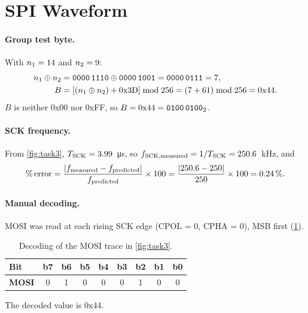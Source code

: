 \section{SPI Waveform}
\label{sec:spi-waveform}

\paragraph{Group test byte.}
With $n_1 = 14$ and $n_2 = 9$:
\begin{align}
  n_1 \oplus n_2 &= \texttt{0000\,1110} \oplus \texttt{0000\,1001} = \texttt{0000\,0111} = 7, \\
  B &= \left[(n_1 \oplus n_2) + \text{0x3D}\right] \bmod 256
     = (7 + 61) \bmod 256 = \text{0x44}.
\end{align}
$B$ is neither 0x00 nor 0xFF, so $B = \text{0x44} = \texttt{0100\,0100}_2$.


\paragraph{SCK frequency.}
From \cref{fig:task3}, $T_\mathrm{SCK} = 3.99$~\si{\micro\second}, so
$f_\mathrm{SCK,measured} = 1/T_\mathrm{SCK} = 250.6$~kHz, and
\begin{equation}
  \%\,\mathrm{error}
  = \frac{\lvert f_\mathrm{measured} - f_\mathrm{predicted}\rvert}{f_\mathrm{predicted}} \times 100
  = \frac{\lvert 250.6 - 250 \rvert}{250} \times 100
  = 0.24\,\%.
\end{equation}

\paragraph{Manual decoding.}
MOSI was read at each rising SCK edge (CPOL = 0, CPHA = 0), MSB first
(\cref{tab:decode}).

\begin{table}[htbp]
  \centering
  \caption{Decoding of the MOSI trace in \cref{fig:task3}.}
  \label{tab:decode}
  \begin{tabular}{@{}lcccccccc@{}}
    \toprule
    \textbf{Bit}  & b7 & b6 & b5 & b4 & b3 & b2 & b1 & b0 \\
    \midrule
    \textbf{MOSI} & 0 & 1 & 0 & 0 & 0 & 1 & 0 & 0 \\
    \bottomrule
  \end{tabular}
\end{table}

The decoded value is 0x44.
